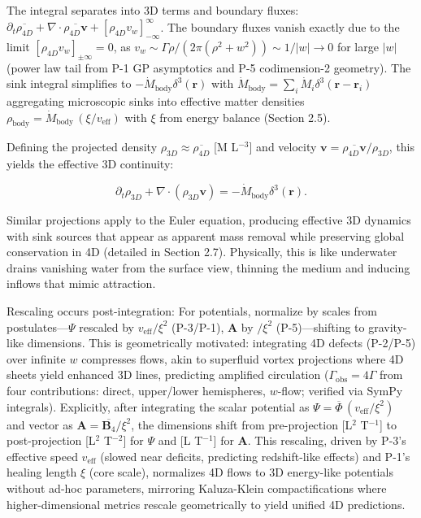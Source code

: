 The integral separates into 3D terms and boundary fluxes: $\partial_t \overline{\rho_{4D}} + \nabla \cdot \overline{\rho_{4D} \mathbf{v}} + [\rho_{4D} v_w]_{-\infty}^{\infty}$. The boundary fluxes vanish exactly due to the limit $[\rho_{4D} v_w]_{\pm \infty} = 0$, as $v_w \sim \Gamma \rho / (2 \pi (\rho^2 + w^2)) \sim 1/|w| \to 0$ for large $|w|$ (power law tail from P-1 GP asymptotics and P-5 codimension-2 geometry). The sink integral simplifies to $-\dot{M}_{\text{body}} \delta^3(\mathbf{r})$ with $\dot{M}_{\text{body}} = \sum_i \dot{M}_i \delta^3(\mathbf{r} - \mathbf{r}_i)$ aggregating microscopic sinks into effective matter densities $\rho_{\text{body}} = \dot{M}_{\text{body}} \, (\xi / v_{\text{eff}})$ with $\xi$ from energy balance (Section 2.5).

Defining the projected density $\rho_{3D} \approx \overline{\rho_{4D}}$ [M L$^{-3}$] and velocity $\mathbf{v} = \overline{\rho_{4D} \mathbf{v}} / \rho_{3D}$, this yields the effective 3D continuity:

\[
\partial_t \rho_{3D} + \nabla \cdot (\rho_{3D} \mathbf{v}) = -\dot{M}_{\text{body}} \delta^3(\mathbf{r}).
\]

Similar projections apply to the Euler equation, producing effective 3D dynamics with sink sources that appear as apparent mass removal while preserving global conservation in 4D (detailed in Section 2.7). Physically, this is like underwater drains vanishing water from the surface view, thinning the medium and inducing inflows that mimic attraction.

Rescaling occurs post-integration: For potentials, normalize by scales from postulates---$\Psi$ rescaled by $v_{\text{eff}} / \xi^2$ (P-3/P-1), $\mathbf{A}$ by $/ \xi^2$ (P-5)---shifting to gravity-like dimensions. This is geometrically motivated: integrating 4D defects (P-2/P-5) over infinite $w$ compresses flows, akin to superfluid vortex projections where 4D sheets yield enhanced 3D lines, predicting amplified circulation ($\Gamma_{\text{obs}} = 4\Gamma$ from four contributions: direct, upper/lower hemispheres, $w$-flow; verified via SymPy integrals). Explicitly, after integrating the scalar potential as $\Psi = \overline{\Phi} \, (v_{\text{eff}} / \xi^2)$ and vector as $\mathbf{A} = \overline{\mathbf{B}_4} / \xi^2$, the dimensions shift from pre-projection [L$^2$ T$^{-1}$] to post-projection [L$^2$ T$^{-2}$] for $\Psi$ and [L T$^{-1}$] for $\mathbf{A}$. This rescaling, driven by P-3's effective speed $v_{\text{eff}}$ (slowed near deficits, predicting redshift-like effects) and P-1's healing length $\xi$ (core scale), normalizes 4D flows to 3D energy-like potentials without ad-hoc parameters, mirroring Kaluza-Klein compactifications where higher-dimensional metrics rescale geometrically to yield unified 4D predictions.

